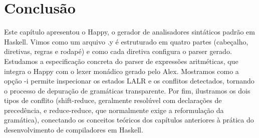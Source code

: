 \section{Conclusão}

Este capítulo apresentou o Happy, o gerador de analisadores
sintáticos padrão em Haskell. Vimos como um arquivo
.y é estruturado em quatro partes
(cabeçalho, diretivas, regras e rodapé) e como cada diretiva
configura o parser gerado. Estudamos a especificação concreta do
parser de expressões aritméticas, que integra o Happy com o lexer
monádico gerado pelo Alex. Mostramos como a opção
-i permite inspecionar os estados LALR e os
conflitos detectados, tornando o processo de depuração de gramáticas
transparente. Por fim, ilustramos os dois tipos de conflito
(shift-reduce, geralmente resolúvel com declarações de precedência, e
reduce-reduce, que normalmente exige a reformulação da gramática),
conectando os conceitos teóricos dos capítulos anteriores à prática
do desenvolvimento de compiladores em Haskell.
